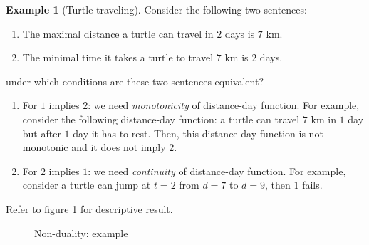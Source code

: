 \documentclass[12pt, a4paper]{article}
\theoremstyle{definition}
\newtheorem{example}{Example}
\begin{document}
\begin{example}[Turtle traveling]
Consider the following two sentences:
\begin{enumerate}
\item The maximal distance a turtle can travel in $2$ days is $7$ km.
\item The minimal time it takes a turtle to travel $7$ km is $2$ days.
\end{enumerate}
under which conditions are these two sentences equivalent?
\begin{enumerate}
\item For $1$ implies $2$: we need \emph{monotonicity} of distance-day function. For example, consider the following distance-day function: a turtle can travel $7$ km in $1$ day but after $1$ day it has to rest. Then, this distance-day function is not monotonic and it does not imply $2$.
\item For $2$ implies $1$: we need \emph{continuity} of distance-day function. For example, consider a turtle can jump at $t=2$ from $d=7$ to $d=9$, then $1$ fails.
\end{enumerate}
Refer to figure \ref{fig2} for descriptive result.
\begin{figure}[h!]
\centering
{}
\caption{Non-duality: example}
\label{fig2}
\end{figure}
\end{example}
\end{document}
